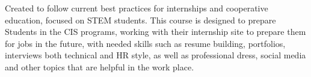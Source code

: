 {%

{Created to follow current best practices for internships and cooperative education, focused on STEM students. This course is designed to prepare Students in the CIS programs, working with their internship site to prepare them for jobs in the future, with needed skills such as resume building, portfolios, interviews both technical and HR style, as well as professional dress, social media and other topics that are helpful in the work place.}
}


